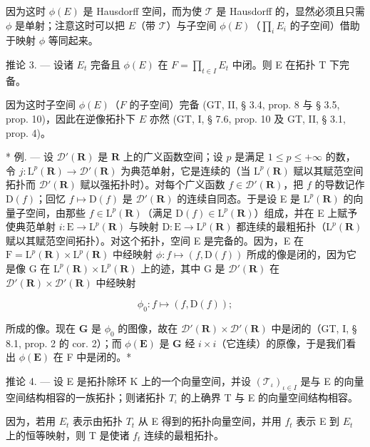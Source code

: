因为这时 \(\phi(E)\) 是 Hausdorff 空间，而为使 \(\mathcal{T}\) 是 Hausdorff 的，显然必须且只需 \(\phi\) 是单射；注意这时可以把 \(E\)（带 \(\mathcal{T}\)）与子空间 \(\phi(E)\)（\(\prod_{i} E_{i}\) 的子空间）借助于映射 \(\phi\) 等同起来。

推论 3. --- 设诸 \(E_{t}\) 完备且 \(\phi(E)\) 在 \(F = \prod_{t \in I} E_{t}\) 中闭。则 E 在拓扑 T 下完备。

因为这时子空间 \(\phi(E)\)（\(F\) 的子空间）完备 (GT, II, § 3.4, prop. 8 与 § 3.5, prop. 10)，因此在逆像拓扑下 \(E\) 亦然 (GT, I, § 7.6, prop. 10 及 GT, II, § 3.1, prop. 4)。

* 例. --- 设 \(\mathcal{D}'(\mathbf{R})\) 是 \(\mathbf{R}\) 上的广义函数空间；设 \(p\) 是满足 \(1 \leqslant p \leqslant +\infty\) 的数，令 \(j: \mathrm{L}^p(\mathbf{R}) \to \mathcal{D}'(\mathbf{R})\) 为典范单射，它是连续的（当 \(\mathrm{L}^p(\mathbf{R})\) 赋以其赋范空间拓扑而 \(\mathcal{D}'(\mathbf{R})\) 赋以强拓扑时）。对每个广义函数 \(f \in \mathcal{D}'(\mathbf{R})\)，把 \(f\) 的导数记作 \(\mathrm{D}(f)\)；回忆 \(f \mapsto \mathrm{D}(f)\) 是 \(\mathcal{D}'(\mathbf{R})\) 的连续自同态。于是设 E 是 \(\mathrm{L}^p(\mathbf{R})\) 的向量子空间，由那些 \(f \in \mathrm{L}^p(\mathbf{R})\)（满足 \(\mathrm{D}(f) \in \mathrm{L}^p(\mathbf{R})\)）组成，并在 E 上赋予使典范单射 \(i: \mathrm{E} \to \mathrm{L}^p(\mathbf{R})\) 与映射 \(\mathrm{D}: \mathrm{E} \to \mathrm{L}^p(\mathbf{R})\) 都连续的最粗拓扑（\(\mathrm{L}^p(\mathbf{R})\) 赋以其赋范空间拓扑）。对这个拓扑，空间 E 是完备的。因为，E 在 \(\mathrm{F} = \mathrm{L}^p(\mathbf{R}) \times \mathrm{L}^p(\mathbf{R})\) 中经映射 \(\phi: f \mapsto (f, \mathrm{D}(f))\) 所成的像是闭的，因为它是像 G 在 \(\mathrm{L}^p(\mathbf{R}) \times \mathrm{L}^p(\mathbf{R})\) 上的迹，其中 G 是 \(\mathcal{D}'(\mathbf{R})\) 在 \(\mathcal{D}'(\mathbf{R}) \times \mathcal{D}'(\mathbf{R})\) 中经映射

\[
\phi_ {0}: f \mapsto (f, \mathrm{D} (f));
\]

所成的像。现在 \(\mathbf{G}\) 是 \(\phi_0\) 的图像，故在 \(\mathcal{D}'(\mathbf{R}) \times \mathcal{D}'(\mathbf{R})\) 中是闭的（GT, I, § 8.1, prop. 2 的 cor. 2）；而 \(\phi(\mathbf{E})\) 是 \(\mathbf{G}\) 经 \(i \times i\)（它连续）的原像，于是我们看出 \(\phi(\mathbf{E})\) 在 F 中是闭的。*

推论 4. --- 设 E 是拓扑除环 K 上的一个向量空间，并设 \((\mathcal{T}_{\iota})_{\iota\in I}\) 是与 E 的向量空间结构相容的一族拓扑；则诸拓扑 \(T_{\iota}\) 的上确界 T 与 E 的向量空间结构相容。

因为，若用 \(E_{t}\) 表示由拓扑 \(T_{t}\) 从 E 得到的拓扑向量空间，并用 \(f_{t}\) 表示 E 到 \(E_{t}\) 上的恒等映射，则 T 是使诸 \(f_{t}\) 连续的最粗拓扑。

